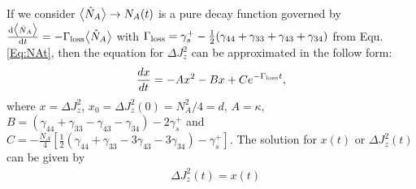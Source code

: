 If we consider $ \big\langle \hat{N}_A \big\rangle\rightarrow N_A(t) $ is a pure decay function governed by $ \frac{{\mathrm d} {\big\langle \hat{N}_A \big\rangle}}{{\mathrm d}t} = -\Gamma_{\rm loss}\big\langle \hat{N}_A \big\rangle $ with $ \Gamma_{\rm loss}= \gamma_s^+ - \frac{1}{2}(\gamma_{44}+\gamma_{33}+\gamma_{43}+\gamma_{34}) $ from Equ.\eqref{Eq:NAt}, then the equation for $ \Delta J_z^2 $ can be approximated in the follow form:
\begin{align}
	\frac{d x}{d t} = -A x^2 - B x + C e^{-\Gamma_{\rm loss}t},
\end{align}
where $ x=\Delta J_z^2 $, $ x_0=\Delta J_z^2(0)=N_A^2/4=d $, $ A = \kappa $, $ B=(\gamma_{44}+\gamma_{33}-\gamma_{43}-\gamma_{34} ) -2\gamma_s^+ $ and $ C=-\frac{N_A}{4}\left[\frac{1}{2}(\gamma_{44}+\gamma_{33}-3\gamma_{43}-3\gamma_{34} ) -\gamma_s^+\right]  $.
The solution for $ x(t) $ or $ \Delta J_z^2(t) $ can be given by
\begin{align}
&\Delta J_z^2(t) = x(t)\nonumber\\

\end{align}
